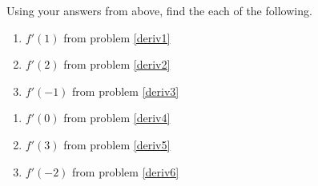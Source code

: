 \documentclass{article}
\newcounter{pset}
\begin{document}
Using your answers from above, find the each of the following.
\begin{multicols}{3}
\begin{enumerate}   \setcounter{enumi}{\value{pset}}
    \item $f'(1)$ from problem \ref{deriv1}
    \item $f'(2)$ from problem \ref{deriv2}
    \item $f'(-1)$ from problem \ref{deriv3}
\end{enumerate} \setcounter{pset}{\value{enumi}}
\end{multicols}
\begin{multicols}{3}
\begin{enumerate}       \setcounter{enumi}{\value{pset}}
    \item $f'(0)$ from problem \ref{deriv4}
    \item $f'(3)$ from problem \ref{deriv5}
    \item $f'(-2)$ from problem \ref{deriv6}
\end{enumerate} \setcounter{pset}{\value{enumi}}
\end{multicols}


\vfill 

\dotfill 
\end{document}
